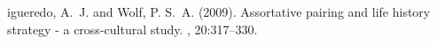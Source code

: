 \documentclass[12pt]{article} %
\begin{document}
\lipsum[12-13]


\begin{thebibliography}{99} %

igueredo, A.~J. and Wolf, P. S.~A. (2009).
\newblock Assortative pairing and life history strategy - a cross-cultural
  study.
, 20:317--330.
 
\end{thebibliography}

\end{document}
